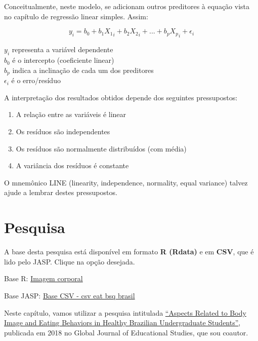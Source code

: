 \documentclass[
]{book}
\providecommand{\tightlist}{%
  \setlength{\itemsep}{0pt}\setlength{\parskip}{0pt}}
\newenvironment{base}{
  \definecolor{shadecolor}{rgb}{0.972,0.972,0.972}  %
  \color{black}
  \begin{shaded}}
 {\end{shaded}}
\begin{document}
Conceitualmente, neste modelo, se adicionam outros preditores à equação vista no capítulo de regressão linear simples. Assim:

\[y_i = b_0 + b_1X{_1}_i + b_2X{_2}_i + ... + b_pX{_p}_i+ \epsilon_{i}\]

\(y_i\) representa a variável dependente\\
\(b_0\) é o intercepto (coeficiente linear)\\
\(b_p\) indica a inclinação de cada um dos preditores\\
\(\epsilon_{i}\) é o erro/resíduo

A interpretação dos resultados obtidos depende dos seguintes pressupostos:

\begin{enumerate}
\def\labelenumi{(\roman{enumi})}
\tightlist
\item
  A relação entre as variáveis é linear
\item
  Os resíduos são independentes\\
\item
  Os resíduos são normalmente distribuídos (com média)\\
\item
  A variância dos resíduos é constante
\end{enumerate}

O mnemônico LINE (linearity, independence, normality, equal variance) talvez ajude a lembrar destes pressupostos.

\hypertarget{pesquisa-10}{%
\section{Pesquisa}\label{pesquisa-10}}

\begin{base}
A base desta pesquisa está disponível em formato \textbf{R (Rdata)} e em \textbf{CSV}, que é lido pelo JASP. Clique na opção desejada.

Base R: \href{https://github.com/anovabr/mqt/raw/master/bases/Base\%20R\%20-\%20imagem\%20corporal.RData}{Imagem corporal}

Base JASP: \href{https://github.com/anovabr/mqt/raw/master/bases/bases_csv_jasp.zip}{Base CSV - csv eat bsq brasil}

\end{base}

Neste capítulo, vamos utilizar a pesquisa intitulada \href{https://www.researchgate.net/publication/323729370_Aspects_Related_to_Body_Image_and_Eating_Behaviors_in_Healthy_Brazilian_Undergraduate_Students}{``Aspects Related to Body Image and Eating Behaviors in Healthy Brazilian Undergraduate Students''}, publicada em 2018 no Global Journal of Educational Studies, que sou coautor.
\end{document}
